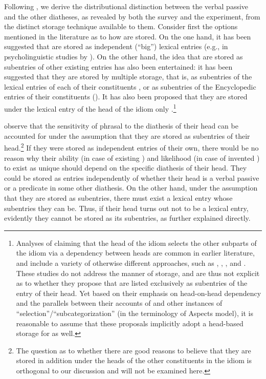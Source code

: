 \documentclass[output=paper]{langsci/langscibook}
\begin{document}
Following \textcite{HorSil2009,HorSil2019}, we derive the distributional
distinction between the verbal passive and the other diatheses, as revealed by
both the survey and the experiment, from the distinct storage technique
available to them. Consider first the options mentioned in the literature as to
how  are stored. On the one hand, it has been suggested that  are
stored as independent (``big'') lexical entries (e.g., in psycholinguistic
studies by \citealt{BobBel1973,SwiCut1979,Gibbs1980}). On the other hand, the
idea that  are stored as subentries of other existing entries has also
been entertained: it has been suggested that they are stored by multiple
storage, that is, as subentries of the lexical entries of each of their
constituents \citep{Everaert2010}, or as subentries of the Encyclopedic entries
of their constituents (\citealt{HarNoy1999}). It has also been proposed that
they are stored under the lexical entry of the head of the idiom only
\parencite{Baltin1989,HorSil2009}.\footnote{Analyses of  claiming that
    the head of the idiom selects the other subparts of the idiom via a
    dependency between heads are common in earlier literature, and include a
    variety of otherwise different approaches, such as \citet{Bresnan1982},
    \citet{Erbach1992}, \citet{KooSpo1991}, and \citet{OGrady1998}.  These
    studies do not address the manner of storage, and are thus not explicit as
    to whether they propose that  are listed exclusively as subentries of
    the entry of their head.  Yet based on their emphasis on head-on-head
    dependency and the parallels between their accounts of  and other
    instances of ``selection''/``subcategorization'' (in the terminology of
     Aspects model), it is reasonable to assume that these
proposals implicitly adopt a head-based storage for  as well.}

\textcite{HorSil2009,HorSil2019} observe that the sensitivity of 
phrasal  to the diathesis of their head can be accounted for under the
assumption that they are stored as subentries of their head.\footnote{
    \textrm{The question as to whether there are good reasons to believe that
        they are stored in addition under the heads of the other constituents
in the idiom is orthogonal to our discussion and will not be examined here.} }
If they were stored as independent entries of their own, there would be no
reason why their ability (in case of existing ) and likelihood (in case
of invented ) to exist as unique  should depend on the specific
diathesis of their head. They could be stored as entries independently of
whether their head is a verbal passive or a predicate in some other diathesis.
On the other hand, under the assumption that they are stored as subentries,
there must exist a lexical entry whose subentries they can be. Thus, if their
head turns out not to be a lexical entry, evidently they cannot be stored as
its subentries, as further explained directly.
\end{document}
